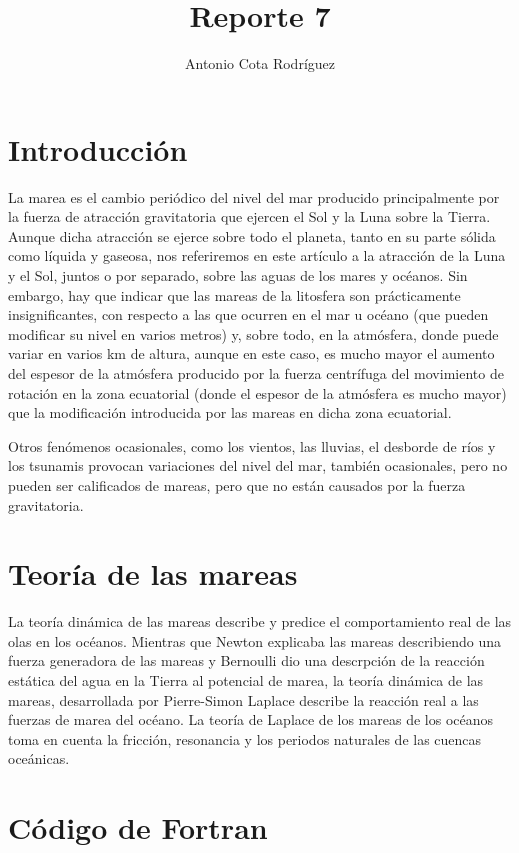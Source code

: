 \documentclass[]{article}
\title{Reporte 7}
\author{Antonio Cota Rodr\'iguez}
\date{}
\begin{document}
\maketitle

\section*{Introducci\'on}
La marea es el cambio periódico del nivel del mar producido principalmente por la fuerza de atracción gravitatoria que ejercen el Sol y la Luna sobre la Tierra. Aunque dicha atracción se ejerce sobre todo el planeta, tanto en su parte sólida como líquida y gaseosa, nos referiremos en este artículo a la atracción de la Luna y el Sol, juntos o por separado, sobre las aguas de los mares y océanos. Sin embargo, hay que indicar que las mareas de la litosfera son prácticamente insignificantes, con respecto a las que ocurren en el mar u océano (que pueden modificar su nivel en varios metros) y, sobre todo, en la atmósfera, donde puede variar en varios km de altura, aunque en este caso, es mucho mayor el aumento del espesor de la atmósfera producido por la fuerza centrífuga del movimiento de rotación en la zona ecuatorial (donde el espesor de la atmósfera es mucho mayor) que la modificación introducida por las mareas en dicha zona ecuatorial.

Otros fenómenos ocasionales, como los vientos, las lluvias, el desborde de ríos y los tsunamis provocan variaciones del nivel del mar, también ocasionales, pero no pueden ser calificados de mareas, pero que no están causados por la fuerza gravitatoria.

\section*{Teor\'ia de las mareas}

La teor\'ia din\'amica de las mareas describe y predice el comportamiento real de las olas en los oc\'eanos.
Mientras que Newton explicaba las mareas describiendo una fuerza generadora de las mareas y Bernoulli dio una descrpci\'on de la reacci\'on est\'atica del agua en la Tierra al potencial de marea, la teor\'ia din\'amica de las mareas, desarrollada por Pierre-Simon Laplace describe la reacci\'on real a las fuerzas de marea del oc\'eano. La teor\'ia de Laplace de los mareas de los oc\'eanos toma en cuenta la fricci\'on, resonancia y los periodos naturales de las cuencas oce\'anicas.

\section*{C\'odigo de Fortran}
\end{document}

